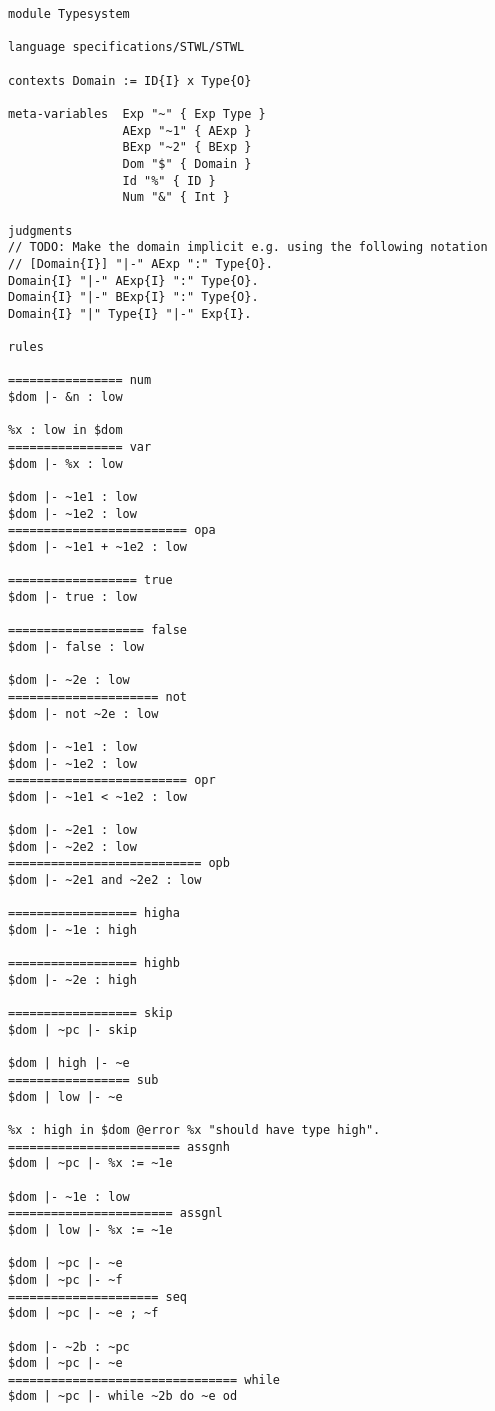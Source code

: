 \begin{lstlisting}[language=sltc]
module Typesystem

language specifications/STWL/STWL

contexts Domain := ID{I} x Type{O}

meta-variables  Exp "~" { Exp Type }
                AExp "~1" { AExp }
                BExp "~2" { BExp }              
                Dom "$" { Domain }
                Id "%" { ID }
                Num "&" { Int }

judgments
// TODO: Make the domain implicit e.g. using the following notation
// [Domain{I}] "|-" AExp ":" Type{O}.
Domain{I} "|-" AExp{I} ":" Type{O}.
Domain{I} "|-" BExp{I} ":" Type{O}.
Domain{I} "|" Type{I} "|-" Exp{I}.

rules

================ num
$dom |- &n : low

%x : low in $dom
================ var
$dom |- %x : low

$dom |- ~1e1 : low
$dom |- ~1e2 : low
========================= opa
$dom |- ~1e1 + ~1e2 : low

================== true
$dom |- true : low

=================== false
$dom |- false : low

$dom |- ~2e : low
===================== not
$dom |- not ~2e : low

$dom |- ~1e1 : low
$dom |- ~1e2 : low
========================= opr
$dom |- ~1e1 < ~1e2 : low

$dom |- ~2e1 : low
$dom |- ~2e2 : low
=========================== opb
$dom |- ~2e1 and ~2e2 : low

================== higha
$dom |- ~1e : high

================== highb
$dom |- ~2e : high

================== skip
$dom | ~pc |- skip

$dom | high |- ~e
================= sub
$dom | low |- ~e

%x : high in $dom @error %x "should have type high".
======================== assgnh
$dom | ~pc |- %x := ~1e

$dom |- ~1e : low
======================= assgnl
$dom | low |- %x := ~1e

$dom | ~pc |- ~e
$dom | ~pc |- ~f
===================== seq
$dom | ~pc |- ~e ; ~f

$dom |- ~2b : ~pc
$dom | ~pc |- ~e
================================ while
$dom | ~pc |- while ~2b do ~e od


\end{lstlisting}
